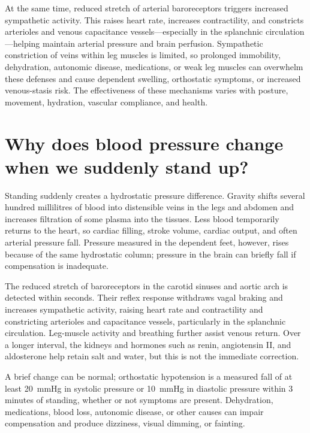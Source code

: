 \documentclass[11pt,oneside]{report}
\begin{document}
At the same time, reduced stretch of arterial baroreceptors triggers increased
sympathetic activity. This raises heart rate, increases contractility, and
constricts arterioles and venous capacitance vessels---especially in the
splanchnic circulation---helping maintain arterial pressure and brain
perfusion. Sympathetic constriction of veins within leg muscles is limited, so
prolonged immobility, dehydration, autonomic disease, medications, or weak leg
muscles can overwhelm these defenses and cause dependent swelling, orthostatic
symptoms, or increased venous-stasis risk. The effectiveness of these
mechanisms varies with posture, movement, hydration, vascular compliance, and
health.

\section{Why does blood pressure change when we suddenly stand up?}

Standing suddenly creates a hydrostatic pressure difference. Gravity shifts
several hundred millilitres of blood into distensible veins in the legs and
abdomen and increases filtration of some plasma into the tissues. Less blood
temporarily returns to the heart, so cardiac filling, stroke volume, cardiac
output, and often arterial pressure fall. Pressure measured in the dependent
feet, however, rises because of the same hydrostatic column; pressure in the
brain can briefly fall if compensation is inadequate.

The reduced stretch of baroreceptors in the carotid sinuses and aortic arch is
detected within seconds. Their reflex response withdraws vagal braking and
increases sympathetic activity, raising heart rate and contractility and
constricting arterioles and capacitance vessels, particularly in the
splanchnic circulation. Leg-muscle activity and breathing further assist
venous return. Over a longer interval, the kidneys and hormones such as renin,
angiotensin II, and aldosterone help retain salt and water, but this is not the
immediate correction.

A brief change can be normal; orthostatic hypotension is a measured fall of at
least 20~mmHg in systolic pressure or 10~mmHg in diastolic pressure within
3 minutes of standing, whether or not symptoms are present. Dehydration,
medications, blood loss, autonomic disease, or other causes can impair
compensation and produce dizziness, visual dimming, or fainting.
\end{document}
